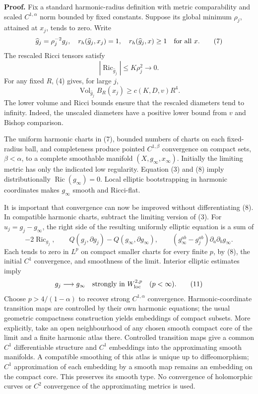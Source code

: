 \documentclass[
  11pt,
]{article}
\begin{document}
\textbf{Proof.} Fix a standard harmonic-radius definition with metric
comparability and scaled \(C^{1,\alpha}\) norm bounded by fixed
constants. Suppose its global minimum \(\rho_j\), attained at \(x_j\),
tends to zero. Write \[
 \widehat g_j=\rho_j^{-2}g_j,
 \quad r_h(\widehat g_j,x_j)=1,
 \quad r_h(\widehat g_j,x)\ge1\quad\hbox{for all }x.      \tag{7}
\] The rescaled Ricci tensors satisfy \[
                |\operatorname{Ric}_{\widehat g_j}|
                     \le K\rho_j^2\longrightarrow0.   \tag{8}
\] For any fixed \(R\), (4) gives, for large \(j\), \[
        \operatorname{Vol}_{\widehat g_j}B_R(x_j)
                          \ge c(K,D,v)R^4.              \tag{9}
\] The lower volume and Ricci bounds ensure that the rescaled diameters
tend to infinity. Indeed, the unscaled diameters have a positive lower
bound from \(v\) and Bishop comparison.

The uniform harmonic charts in (7), bounded numbers of charts on each
fixed-radius ball, and completeness produce pointed \(C^{1,\beta}\)
convergence on compact sets, \(\beta<\alpha\), to a complete smoothable
manifold \((X,g_\infty,x_\infty)\). Initially the limiting metric has
only the indicated low regularity. Equation (3) and (8) imply
distributionally \(\operatorname{Ric}(g_\infty)=0\). Local elliptic
bootstrapping in harmonic coordinates makes \(g_\infty\) smooth and
Ricci-flat.

It is important that convergence can now be improved without
differentiating (8). In compatible harmonic charts, subtract the
limiting version of (3). For \(u_j=g_j-g_\infty\), the right side of the
resulting uniformly elliptic equation is a sum of \[
 -2\operatorname{Ric}_{g_j},\qquad
 Q(g_j,\partial g_j)-Q(g_\infty,\partial g_\infty),\qquad
 (g_\infty^{ab}-g_j^{ab})\partial_a\partial_b g_\infty.
                                                               \tag{10}
\] Each tends to zero in \(L^p\) on compact smaller charts for every
finite \(p\), by (8), the initial \(C^1\) convergence, and smoothness of
the limit. Interior elliptic estimates imply \[
                    g_j\longrightarrow g_\infty
                    \quad\hbox{strongly in }W^{2,p}_{\rm loc}
                    \quad(p<\infty).                   \tag{11}
\] Choose \(p>4/(1-\alpha)\) to recover strong \(C^{1,\alpha}\)
convergence. Harmonic-coordinate transition maps are controlled by their
own harmonic equations; the usual geometric compactness construction
yields embeddings of compact subsets. More explicitly, take an open
neighbourhood of any chosen smooth compact core of the limit and a
finite harmonic atlas there. Controlled transition maps give a common
\(C^1\) differentiable structure and \(C^1\) embeddings into the
approximating smooth manifolds. A compatible smoothing of this atlas is
unique up to diffeomorphism; \(C^1\) approximation of each embedding by
a smooth map remains an embedding on the compact core. This preserves
its smooth type. No convergence of holomorphic curves or \(C^2\)
convergence of the approximating metrics is used.
\end{document}
